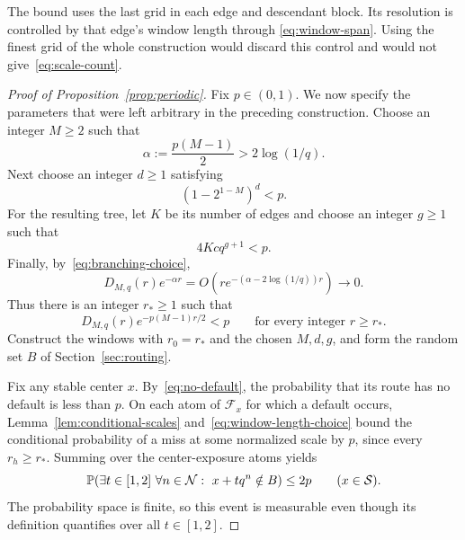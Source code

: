 The bound uses the last grid in each edge and descendant block.
Its resolution is controlled by that edge's window length through
\eqref{eq:window-span}.  Using the finest grid of the whole construction
would discard this control and would not give~\eqref{eq:scale-count}.

\begin{proof}[Proof of Proposition~\ref{prop:periodic}]
Fix $p\in(0,1)$.  We now specify the parameters that were left arbitrary
in the preceding construction.  Choose an integer $M\ge2$ such that
\begin{equation}\label{eq:branching-choice}
 \alpha:=\frac{p(M-1)}2>2\log(1/q).
\end{equation}
Next choose an integer $d\ge1$ satisfying
\[
 (1-2^{1-M})^d<p.
\]
For the resulting tree, let $K$ be its number of edges and choose an
integer $g\ge1$ such that
\[
 4Kc q^{g+1}<p.
\]
Finally, by~\eqref{eq:branching-choice},
\[
 D_{M,q}(r)e^{-\alpha r}
 =O\!\left(r e^{-(\alpha-2\log(1/q))r}\right)
 \longrightarrow0.
\]
Thus there is an integer $r_*\ge1$ such that
\begin{equation}\label{eq:window-length-choice}
 D_{M,q}(r)e^{-p(M-1)r/2}<p
 \qquad\text{for every integer }r\ge r_*.
\end{equation}
Construct the windows with $r_0=r_*$ and the chosen $M,d,g$, and form
the random set $B$ of Section~\ref{sec:routing}.

Fix any stable center $x$.  By~\eqref{eq:no-default}, the probability
that its route has no default is less than $p$.  On each atom of
$\mathcal F_x$ for which a default occurs,
Lemma~\ref{lem:conditional-scales} and~\eqref{eq:window-length-choice}
bound the conditional probability of a miss at some normalized scale
by $p$, since every $r_h\ge r_*$.  Summing over the center-exposure
atoms yields
\begin{equation}\label{eq:stable-miss}
 \mathbb P\!\left(
  \exists t\in[1,2]\ \forall n\in\mathcal N:\
  x+tq^n\notin B
 \right)\le2p
 \qquad(x\in\mathcal S).
\end{equation}
The probability space is finite, so this event is measurable even
though its definition quantifies over all $t\in[1,2]$.


\end{proof}
